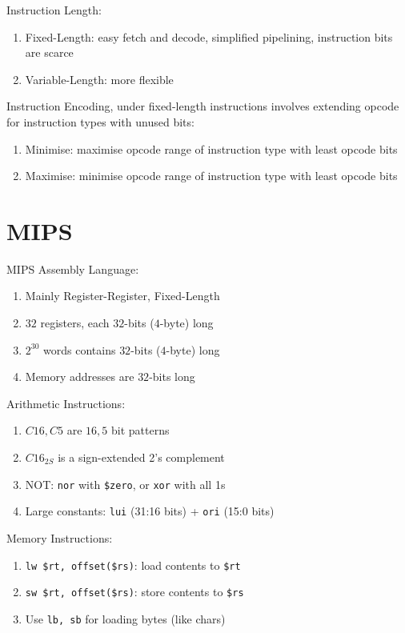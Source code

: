 \documentclass[12pt, a4paper]{article}
\begin{document}
\begin{multicols*}{3}
Instruction Length:
\begin{enumerate}[\roman*.]
  \item Fixed-Length: easy fetch and decode, simplified pipelining, instruction bits are scarce
  \item Variable-Length: more flexible
\end{enumerate}

Instruction Encoding, under fixed-length instructions involves extending opcode for instruction types with unused bits:
\begin{enumerate}
  \item Minimise: maximise opcode range of instruction type with least opcode bits
  \item Maximise: minimise opcode range of instruction type with least opcode bits
\end{enumerate}

\colbreak

\section{MIPS}

MIPS Assembly Language:
\begin{enumerate}[\roman*.]
  \item Mainly Register-Register, Fixed-Length
  \item $32$ registers, each $32$-bits ($4$-byte) long
  \item $2^{30}$ words contains $32$-bits ($4$-byte) long 
  \item Memory addresses are $32$-bits long
\end{enumerate}

Arithmetic Instructions:
\begin{enumerate}[\roman*.]
  \item $C16, C5$ are $16, 5$ bit patterns
  \item $C16_{2S}$ is a sign-extended 2's complement
  \item NOT: \lstinline|nor| with \lstinline|$zero|, or \lstinline|xor| with all 1s
  \item Large constants: \lstinline|lui| (31:16 bits) + \lstinline|ori| (15:0 bits)
\end{enumerate}
Memory Instructions:
\begin{enumerate}[\roman*.]
  \item \lstinline|lw $rt, offset($rs)|: load contents to \lstinline|$rt|
  \item \lstinline|sw $rt, offset($rs)|: store contents to \lstinline|$rs|
  \item Use \lstinline|lb, sb| for loading bytes (like chars)
\end{enumerate}


\end{multicols*}
\end{document}
